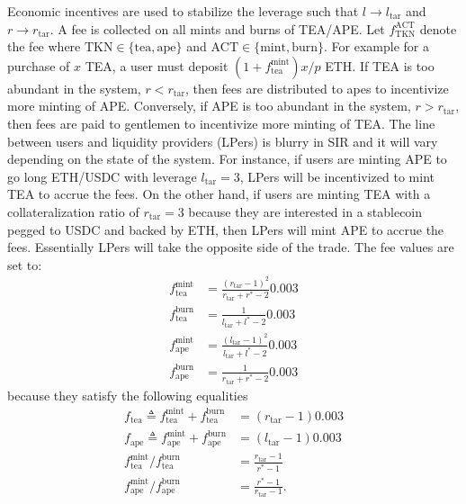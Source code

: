 \documentclass[journal,letterpaper,oneside,onecolumn,12pt]{IEEEtran}
\begin{document}
	Economic incentives are used to stabilize the leverage such that $l\rightarrow l_\textrm{tar}$ and $r\rightarrow r_\textrm{tar}$.
	A fee is collected on all mints and burns of TEA/APE. Let $f_\textrm{TKN}^\textrm{ACT}$ denote the fee where $\textrm{TKN}\in\{\textrm{tea},\textrm{ape}\}$ and $\textrm{ACT}\in\{\textrm{mint},\textrm{burn}\}$. For example for a purchase of $x$ TEA, a user must deposit $(1+f_\textrm{tea}^\textrm{mint})x/p$ ETH. If TEA is too abundant in the system, $r<r_\textrm{tar}$, then fees are distributed to apes to incentivize more minting of APE. Conversely, if APE is too abundant in the system, $r>r_\textrm{tar}$, then fees are paid to gentlemen to incentivize more minting of TEA. The line between users and liquidity providers (LPers) is blurry in SIR and it will vary depending on the state of the system. For instance, if users are minting APE to go long ETH/USDC with leverage $l_\textrm{tar}=3$, LPers will be incentivized to mint TEA to accrue the fees. On the other hand, if users are minting TEA with a collateralization ratio of $r_\textrm{tar}=3$ because they are interested in a stablecoin pegged to USDC and backed by ETH, then LPers will mint APE to accrue the fees. Essentially LPers will take the opposite side of the trade.
	The fee values are set to:
	\begin{align}
		f_\textrm{tea}^\textrm{mint} &= \frac{(r_\textrm{tar}-1)^2}{r_\textrm{tar}+r^*-2} 0.003  \label{eq:fee:tea_mint} \\
		f_\textrm{tea}^\textrm{burn} &= \frac{1}{l_\textrm{tar}+l^*-2} 0.003  \\
		f_\textrm{ape}^\textrm{mint} &= \frac{(l_\textrm{tar}-1)^2}{l_\textrm{tar}+l^*-2} 0.003 \\
		f_\textrm{ape}^\textrm{burn} &= \frac{1}{r_\textrm{tar}+r^*-2} 0.003 \label{eq:fee:ape_burn}
	\end{align}
	because they satisfy the following equalities
	\begin{align}
		f_\textrm{tea} \triangleq f_\textrm{tea}^\textrm{mint} +f_\textrm{tea}^\textrm{burn} &= (r_\textrm{tar}-1)0.003 \label{eq:fee:tea} \\
		f_\textrm{ape} \triangleq f_\textrm{ape}^\textrm{mint} +f_\textrm{ape}^\textrm{burn} &= (l_\textrm{tar}-1)0.003 \label{eq:fee:ape} \\
		f_\textrm{tea}^\textrm{mint}/f_\textrm{tea}^\textrm{burn} &= \frac{r_\textrm{tar}-1}{r^*-1} \label{eq:fee_ratio:tea} \\
		f_\textrm{ape}^\textrm{mint}/f_\textrm{ape}^\textrm{burn} &= \frac{r^*-1}{r_\textrm{tar}-1}. \label{eq:fee_ratio:ape}
	\end{align}
\end{document}
